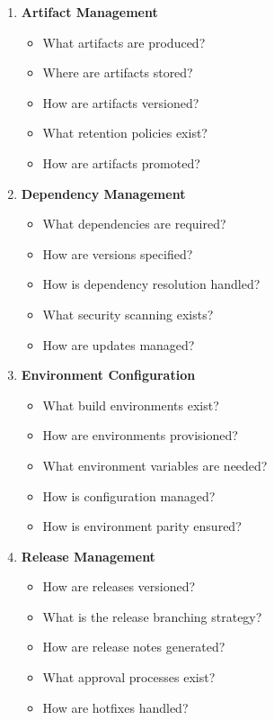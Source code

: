 \documentclass[11pt,letterpaper]{article}
\begin{document}
\begin{enumerate}[label=\textbf{C\arabic*:}, leftmargin=2.5em]
    \item \textbf{Artifact Management}
    \begin{itemize}[nosep]
        \item What artifacts are produced?
        \item Where are artifacts stored?
        \item How are artifacts versioned?
        \item What retention policies exist?
        \item How are artifacts promoted?
    \end{itemize}
    
    \item \textbf{Dependency Management}
    \begin{itemize}[nosep]
        \item What dependencies are required?
        \item How are versions specified?
        \item How is dependency resolution handled?
        \item What security scanning exists?
        \item How are updates managed?
    \end{itemize}
    
    \item \textbf{Environment Configuration}
    \begin{itemize}[nosep]
        \item What build environments exist?
        \item How are environments provisioned?
        \item What environment variables are needed?
        \item How is configuration managed?
        \item How is environment parity ensured?
    \end{itemize}
    
    \item \textbf{Release Management}
    \begin{itemize}[nosep]
        \item How are releases versioned?
        \item What is the release branching strategy?
        \item How are release notes generated?
        \item What approval processes exist?
        \item How are hotfixes handled?
    \end{itemize}
    

\end{enumerate}
\end{document}
